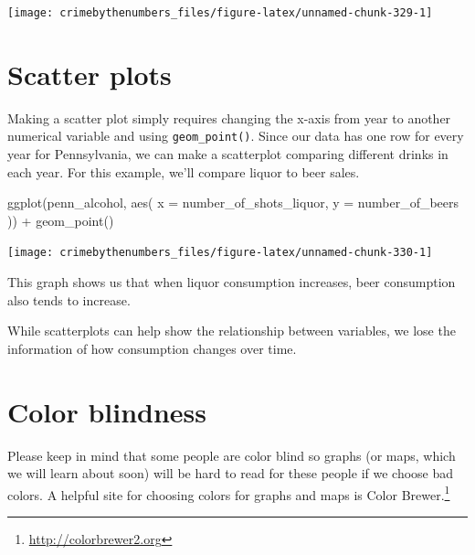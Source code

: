 \documentclass[
  a4paper,
]{krantz}
\makeatletter
\newenvironment{Shaded}{\begin{snugshade}}{\end{snugshade}}
\newcommand{\AttributeTok}[1]{\textcolor[rgb]{0.77,0.63,0.00}{#1}}
\newcommand{\FunctionTok}[1]{\textcolor[rgb]{0.00,0.00,0.00}{#1}}
\newcommand{\NormalTok}[1]{#1}
\newcommand{\SpecialCharTok}[1]{\textcolor[rgb]{0.00,0.00,0.00}{#1}}
\renewcommand{\href}[2]{#2\footnote{\url{#1}}}
\newenvironment{kframe}{%
\medskip{}
\setlength{\fboxsep}{.8em}
 \def\at@end@of@kframe{}%
 \ifinner\ifhmode%
  \def\at@end@of@kframe{\end{minipage}}%
  \begin{minipage}{\columnwidth}%
 \fi\fi%
 \def\FrameCommand##1{\hskip\@totalleftmargin \hskip-\fboxsep
 \colorbox{shadecolor}{##1}\hskip-\fboxsep
     \hskip-\linewidth \hskip-\@totalleftmargin \hskip\columnwidth}%
 \MakeFramed {\advance\hsize-\width
   \@totalleftmargin\z@ \linewidth\hsize
   \@setminipage}}%
 {\par\unskip\endMakeFramed%
 \at@end@of@kframe}
\renewenvironment{Shaded}{\begin{kframe}}{\end{kframe}}
\makeatother
\begin{document}
\begin{center}\texttt{[image: crimebythenumbers\_files/figure-latex/unnamed-chunk-329-1]} \end{center}

\hypertarget{scatter-plots}{%
\section{Scatter plots}\label{scatter-plots}}

Making a scatter plot simply requires changing the x-axis
from year to another numerical variable and using
\texttt{geom\_point()}. Since our data has one row for every
year for Pennsylvania, we can make a scatterplot comparing
different drinks in each year. For this example, we'll
compare liquor to beer sales.

\begin{Shaded}
\begin{Highlighting}[]
\FunctionTok{ggplot}\NormalTok{(penn\_alcohol, }\FunctionTok{aes}\NormalTok{(}
  \AttributeTok{x =}\NormalTok{ number\_of\_shots\_liquor,}
  \AttributeTok{y =}\NormalTok{ number\_of\_beers}
\NormalTok{)) }\SpecialCharTok{+}
  \FunctionTok{geom\_point}\NormalTok{()}
\end{Highlighting}
\end{Shaded}

\begin{center}\texttt{[image: crimebythenumbers\_files/figure-latex/unnamed-chunk-330-1]} \end{center}

This graph shows us that when liquor consumption increases,
beer consumption also tends to increase.

While scatterplots can help show the relationship between
variables, we lose the information of how consumption
changes over time.

\hypertarget{color-blindness}{%
\section{Color blindness}\label{color-blindness}}

Please keep in mind that some people are color blind so
graphs (or maps, which we will learn about soon) will be
hard to read for these people if we choose bad colors. A
helpful site for choosing colors for graphs and maps is
\href{http://colorbrewer2.org}{Color Brewer.}
\end{document}
